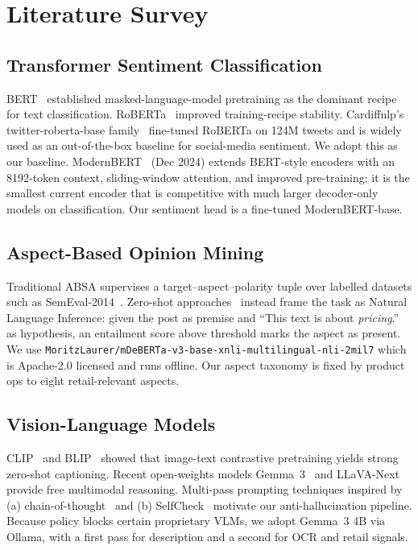 \chapter{Literature Survey}\label{ch:lit}

\section{Transformer Sentiment Classification}
BERT~\citep{devlin2019bert} established masked-language-model pretraining as
the dominant recipe for text classification.  RoBERTa~\citep{liu2019roberta}
improved training-recipe stability.  Cardiffnlp's twitter-roberta-base
family~\citep{loureiro2022timelms} fine-tuned RoBERTa on 124M tweets and is
widely used as an out-of-the-box baseline for social-media sentiment.  We
adopt this as our baseline.  ModernBERT~\citep{warner2024modernbert} (Dec 2024)
extends BERT-style encoders with an 8192-token context, sliding-window
attention, and improved pre-training; it is the smallest current encoder
that is competitive with much larger decoder-only models on classification.
Our sentiment head is a fine-tuned ModernBERT-base.

\section{Aspect-Based Opinion Mining}
Traditional ABSA supervises a target--aspect--polarity tuple over labelled
datasets such as SemEval-2014~\citep{pontiki2014semeval}.  Zero-shot
approaches~\citep{yin2019benchmarking} instead frame the task as Natural
Language Inference: given the post as premise and ``This text is about
\emph{pricing}.'' as hypothesis, an entailment score above threshold marks
the aspect as present.  We use \texttt{MoritzLaurer/mDeBERTa-v3-base-xnli-multilingual-nli-2mil7}
which is Apache-2.0 licensed and runs offline.  Our aspect taxonomy is fixed
by product ops to eight retail-relevant aspects.

\section{Vision-Language Models}
CLIP~\citep{radford2021learning} and BLIP~\citep{li2022blip} showed that
image-text contrastive pretraining yields strong zero-shot captioning.
Recent open-weights models Gemma~3~\citep{gemma3_2025} and LLaVA-Next
provide free multimodal reasoning.  Multi-pass prompting techniques
inspired by (a) chain-of-thought~\citep{wei2022cot} and (b) SelfCheck~\citep{selfcheck2023}
motivate our anti-hallucination pipeline.  Because policy blocks certain
proprietary VLMs, we adopt Gemma~3 4B via Ollama, with a first pass for
description and a second for OCR and retail signals.

